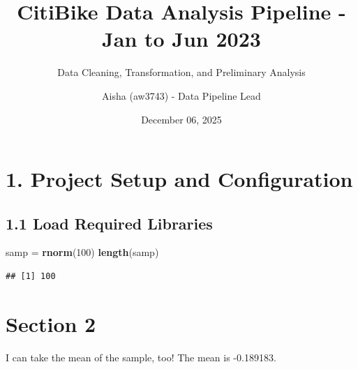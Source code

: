 \documentclass[
]{article}
\title{CitiBike Data Analysis Pipeline - Jan to Jun 2023}
\subtitle{Data Cleaning, Transformation, and Preliminary Analysis}
\author{Aisha (aw3743) - Data Pipeline Lead}
\date{December 06, 2025}
\newenvironment{Shaded}{\begin{snugshade}}{\end{snugshade}}
\newcommand{\DecValTok}[1]{\textcolor[rgb]{0.00,0.00,0.81}{#1}}
\newcommand{\FunctionTok}[1]{\textcolor[rgb]{0.13,0.29,0.53}{\textbf{#1}}}
\newcommand{\NormalTok}[1]{#1}
\newcommand{\OtherTok}[1]{\textcolor[rgb]{0.56,0.35,0.01}{#1}}
\begin{document}
\maketitle

\renewcommand*\contentsname{Table of Contents}
{
\setcounter{tocdepth}{2}
\tableofcontents
}
\section{1. Project Setup and
Configuration}\label{project-setup-and-configuration}

\subsection{1.1 Load Required Libraries}\label{load-required-libraries}

\begin{Shaded}
\begin{Highlighting}[]
\NormalTok{samp }\OtherTok{=} \FunctionTok{rnorm}\NormalTok{(}\DecValTok{100}\NormalTok{)}
\FunctionTok{length}\NormalTok{(samp)}
\end{Highlighting}
\end{Shaded}

\begin{verbatim}
## [1] 100
\end{verbatim}

\section{Section 2}\label{section-2}

I can take the mean of the sample, too! The mean is -0.189183.
\end{document}
